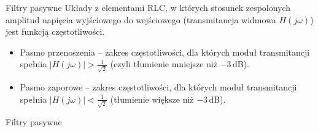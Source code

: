 \begin{frame}{Filtry pasywne}
	Układy z elementami RLC, w których stosunek zespolonych amplitud napięcia wyjściowego do wejściowego (transmitancja widmowa $H(j\omega)$) jest funkcją częstotliwości.
	\begin{itemize}
		\item[\bt] Pasmo przenoszenia – zakres częstotliwości, dla których moduł transmitancji spełnia $|H(j\omega)| > \frac{1}{\sqrt{2}}$ (czyli tłumienie mniejsze niż $-3\,$dB).
		\item[\bt] Pasmo zaporowe – zakres częstotliwości, dla których moduł transmitancji spełnia $|H(j\omega)| < \frac{1}{\sqrt{2}}$ (tłumienie większe niż $-3\,$dB).
	\end{itemize}
\end{frame}

\begin{frame}{Filtry pasywne}


\end{frame}
